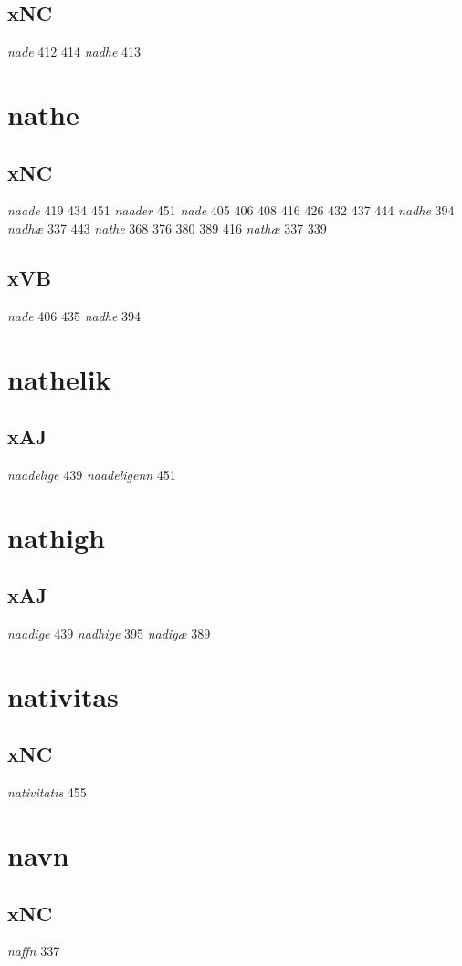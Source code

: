 \documentclass[a4paper,twocolumn]{article}
\begin{document}
\subsection{xNC}
\label{sec:org15e389a}
\emph{nade} 412 414 \emph{nadhe} 413 
\section{nathe}
\label{sec:org57f8d6b}
\subsection{xNC}
\label{sec:org826ab39}
\emph{naade} 419 434 451 \emph{naader} 451 \emph{nade} 405 406 408 416 426 432 437 444 \emph{nadhe} 394 \emph{nadhæ} 337 443 \emph{nathe} 368 376 380 389 416 \emph{nathæ} 337 339 
\subsection{xVB}
\label{sec:orga8a1c17}
\emph{nade} 406 435 \emph{nadhe} 394 
\section{nathelik}
\label{sec:orgb50ebaf}
\subsection{xAJ}
\label{sec:org3b4b6df}
\emph{naadelige} 439 \emph{naadeligenn} 451 
\section{nathigh}
\label{sec:orgdd39921}
\subsection{xAJ}
\label{sec:orge1327a2}
\emph{naadige} 439 \emph{nadhige} 395 \emph{nadigæ} 389 
\section{nativitas}
\label{sec:org843f2bd}
\subsection{xNC}
\label{sec:org2670fc2}
\emph{nativitatis} 455 
\section{navn}
\label{sec:orgd637f3a}
\subsection{xNC}
\label{sec:org1f0a6e1}
\emph{naffn} 337 
\end{document}
